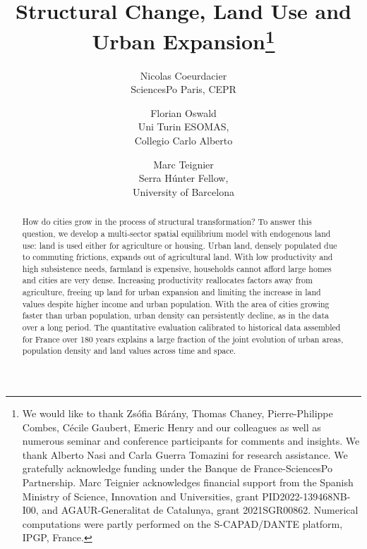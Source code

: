\documentclass[11pt]{article}
\begin{document}
	
	
\title{Structural Change, Land Use and Urban Expansion\thanks{We would like to thank Zs\'ofia B\'ar\'any, Thomas Chaney, Pierre-Philippe Combes, C\'ecile Gaubert, Emeric Henry and our colleagues as well as numerous seminar and conference participants for comments and insights. We thank Alberto Nasi and Carla Guerra Tomazini for research assistance. We gratefully acknowledge funding under the Banque de France-SciencesPo Partnership. Marc Teignier acknowledges financial support from the Spanish Ministry of Science, Innovation and Universities, grant PID2022-139468NB-I00, and AGAUR-Generalitat de Catalunya, grant 2021SGR00862. Numerical computations were partly performed on the S-CAPAD/DANTE platform, IPGP, France.}}
\author{%
	Nicolas Coeurdacier\\ \small SciencesPo Paris, CEPR
	\and Florian Oswald\\ \small Uni Turin ESOMAS,\\\small Collegio Carlo Alberto
	\and Marc Teignier\\ \small Serra Húnter Fellow, \\\small University of Barcelona
}

\maketitle

\begin{abstract}
	\noindent 
	 How do cities grow in the process of structural transformation? To answer this question, we develop a multi-sector spatial equilibrium model with endogenous land use: land is used either for agriculture or housing. Urban land, densely populated due to commuting frictions, expands out of agricultural land. With low productivity and high subsistence needs, farmland is expensive, households cannot afford large homes and cities are very dense. Increasing productivity reallocates factors away from agriculture, freeing up land for urban expansion and limiting the increase in land values despite higher income and urban population. With the area of cities growing faster than urban population, urban density can persistently decline, as in the data over a long period. The quantitative evaluation calibrated to historical data assembled for France over 180 years explains a large fraction of the joint evolution of urban areas, population density and land values across time and space. 
\end{abstract}
\end{document}
